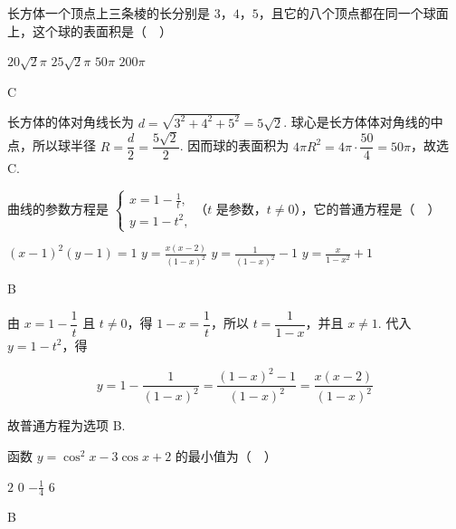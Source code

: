 \documentclass[UTF8,a4paper,oneside,11pt]{ctexbook}
\begin{document}
\begin{problem}
长方体一个顶点上三条棱的长分别是 \(3\)，\(4\)，\(5\)，且它的八个顶点都在同一个球面上，这个球的表面积是（\(\quad\)）

\choices
    {\(20\sqrt{2}\pi\)}
    {\(25\sqrt{2}\pi\)}
    {\(50\pi\)}
    {\(200\pi\)}
\end{problem}

\begin{answer}
C
\end{answer}

\begin{solution}
长方体的体对角线长为 \(d=\sqrt{3^{2}+4^{2}+5^{2}}=5\sqrt{2}\). 球心是长方体体对角线的中点，所以球半径 \(R=\dfrac{d}{2}=\dfrac{5\sqrt{2}}{2}\). 因而球的表面积为 \(4\pi R^{2}=4\pi\cdot\dfrac{50}{4}=50\pi\)，故选 C.
\end{solution}

\begin{problem}
曲线的参数方程是 \(\begin{cases}
x = 1 - \frac{1}{t},\\
y = 1 - t^2,
\end{cases}\)（\(t\) 是参数，\(t \neq 0\)），它的普通方程是（\(\quad\)）

\choices
    {\((x - 1)^{2}(y - 1) = 1\)}
    {\(y = \frac{x(x - 2)}{(1 - x)^2}\)}
    {\(y = \frac{1}{(1 - x)^2} - 1\)}
    {\(y = \frac{x}{1 - x^2} + 1\)}
\end{problem}

\begin{answer}
B
\end{answer}

\begin{solution}
由 \(x=1-\dfrac1t\) 且 \(t\ne0\)，得 \(1-x=\dfrac1t\)，所以 \(t=\dfrac1{1-x}\)，并且 \(x\ne1\). 代入 \(y=1-t^{2}\)，得

\[
y=1-\frac{1}{(1-x)^{2}}=\frac{(1-x)^{2}-1}{(1-x)^{2}}=\frac{x(x-2)}{(1-x)^{2}}
\]

故普通方程为选项 B.
\end{solution}

\begin{problem}
函数 \(y = \cos^2 x - 3\cos x + 2\) 的最小值为（\(\quad\)）

\choices
    {\(2\)}
    {\(0\)}
    {\(-\frac{1}{4}\)}
    {\(6\)}
\end{problem}

\begin{answer}
B
\end{answer}
\end{document}
